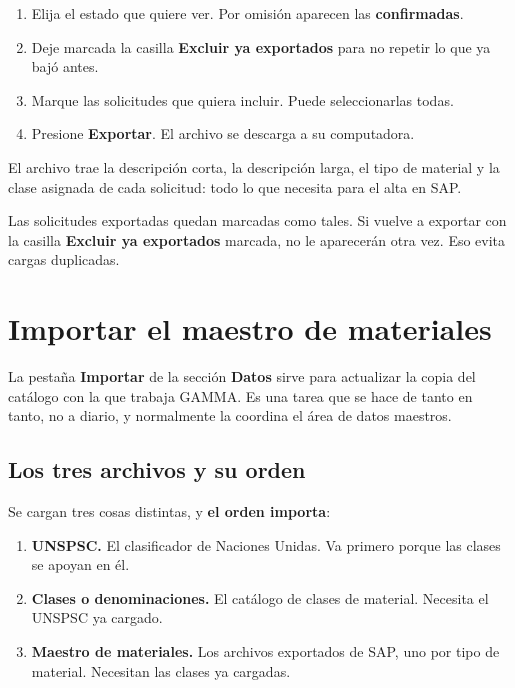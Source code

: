 \begin{enumerate}[leftmargin=*, itemsep=3pt]
  \item Elija el estado que quiere ver. Por omisión aparecen las
        \textbf{confirmadas}.
  \item Deje marcada la casilla \textbf{Excluir ya exportados} para no repetir
        lo que ya bajó antes.
  \item Marque las solicitudes que quiera incluir. Puede seleccionarlas todas.
  \item Presione \textbf{Exportar}. El archivo se descarga a su computadora.
\end{enumerate}


El archivo trae la descripción corta, la descripción larga, el tipo de material
y la clase asignada de cada solicitud: todo lo que necesita para el alta en SAP.

\begin{aviso}
Las solicitudes exportadas quedan marcadas como tales. Si vuelve a exportar con
la casilla \textbf{Excluir ya exportados} marcada, no le aparecerán otra vez.
Eso evita cargas duplicadas.
\end{aviso}

\newpage
\section{Importar el maestro de materiales}

La pestaña \textbf{Importar} de la sección \textbf{Datos} sirve para actualizar
la copia del catálogo con la que trabaja GAMMA. Es una tarea que se hace de
tanto en tanto, no a diario, y normalmente la coordina el área de datos
maestros.


\subsection{Los tres archivos y su orden}

Se cargan tres cosas distintas, y \textbf{el orden importa}:

\begin{enumerate}[leftmargin=*, itemsep=4pt]
  \item \textbf{UNSPSC.} El clasificador de Naciones Unidas. Va primero porque
        las clases se apoyan en él.
  \item \textbf{Clases o denominaciones.} El catálogo de clases de material.
        Necesita el UNSPSC ya cargado.
  \item \textbf{Maestro de materiales.} Los archivos exportados de SAP, uno por
        tipo de material. Necesitan las clases ya cargadas.
\end{enumerate}

